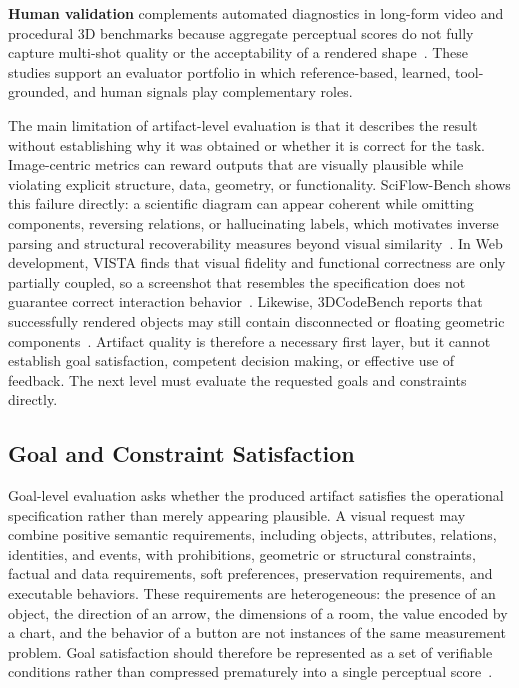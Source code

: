 \textbf{Human validation} complements automated diagnostics in long-form video and procedural 3D benchmarks because aggregate perceptual scores do not fully capture multi-shot quality or the acceptability of a rendered shape~\cite{avg260530090,avg260601057}. These studies support an evaluator portfolio in which reference-based, learned, tool-grounded, and human signals play complementary roles.

The main limitation of artifact-level evaluation is that it describes the result without establishing why it was obtained or whether it is correct for the task. Image-centric metrics can reward outputs that are visually plausible while violating explicit structure, data, geometry, or functionality. SciFlow-Bench shows this failure directly: a scientific diagram can appear coherent while omitting components, reversing relations, or hallucinating labels, which motivates inverse parsing and structural recoverability measures beyond visual similarity~\cite{avg260209809}. In Web development, VISTA finds that visual fidelity and functional correctness are only partially coupled, so a screenshot that resembles the specification does not guarantee correct interaction behavior~\cite{avg260526144}. Likewise, 3DCodeBench reports that successfully rendered objects may still contain disconnected or floating geometric components~\cite{avg260601057}. Artifact quality is therefore a necessary first layer, but it cannot establish goal satisfaction, competent decision making, or effective use of feedback. The next level must evaluate the requested goals and constraints directly.

\subsection{Goal and Constraint Satisfaction}
\label{subsec:goal-satisfaction}

Goal-level evaluation asks whether the produced artifact satisfies the operational specification rather than merely appearing plausible. A visual request may combine positive semantic requirements, including objects, attributes, relations, identities, and events, with prohibitions, geometric or structural constraints, factual and data requirements, soft preferences, preservation requirements, and executable behaviors. These requirements are heterogeneous: the presence of an object, the direction of an arrow, the dimensions of a room, the value encoded by a chart, and the behavior of a button are not instances of the same measurement problem. Goal satisfaction should therefore be represented as a set of verifiable conditions rather than compressed prematurely into a single perceptual score~\cite{avg260329139,avg250913399,avg260707189,avg260526144,avg250925229,avg260209809}.

